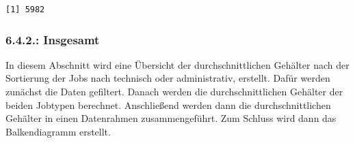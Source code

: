 \documentclass[
  letterpaper,
  DIV=11,
  numbers=noendperiod]{scrartcl}
\begin{document}
\begin{verbatim}
[1] 5982
\end{verbatim}

\hypertarget{insgesamt}{%
\subsubsection{6.4.2.: Insgesamt}\label{insgesamt}}

In diesem Abschnitt wird eine Übersicht der durchschnittlichen Gehälter
nach der Sortierung der Jobs nach technisch oder administrativ,
erstellt. Dafür werden zunächst die Daten gefiltert. Danach werden die
durchschnittlichen Gehälter der beiden Jobtypen berechnet. Anschließend
werden dann die durchschnittlichen Gehälter in einen Datenrahmen
zusammengeführt. Zum Schluss wird dann das Balkendiagramm erstellt.
\end{document}
